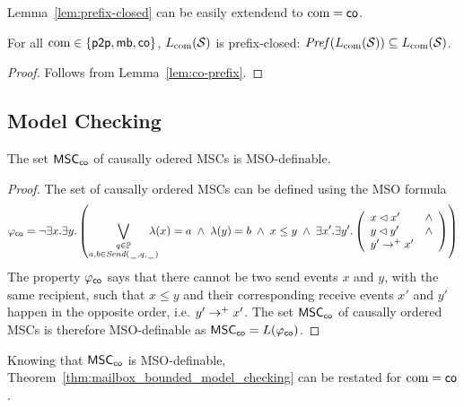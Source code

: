 \documentclass{article}
\begin{document}
Lemma~\ref{lem:prefix-closed} can be easily extendend to $\textup{com} = \mathsf{co}$.

\begin{lemma}\label{lem:co-prefix-closed}
	For all $\textup{com} \in \{\mathsf{p2p}, \mathsf{mb}, \mathsf{co}\}$, $L_{\textup{com}}(\mathcal{S})$ is prefix-closed:
	$\mathit{Pref}(L_{\textup{com}}(\mathcal{S})) \subseteq L_{\textup{com}}(\mathcal{S})$.
\end{lemma}
\begin{proof}
	Follows from Lemma~\ref{lem:co-prefix}.
\end{proof}

\subsection{Model Checking}

\begin{proposition}\label{prop:co_mso}
	The set $\mathsf{MSC}_{\mathsf{co}}$ of causally odered MSCs is MSO-definable.
\end{proposition}
\begin{proof}
	The set of causally ordered MSCs can be defined using the MSO formula
	\[
	\varphi_{\mathsf{co}} =
	\neg \exists x.\exists y. \left(
	\bigvee_{\substack{q \in \mathbb{P}\\a,b \in {\mathit{Send}(\hspace{0.1em}\underline{\hspace{0.5em}}\hspace{0.1em},q,\hspace{0.1em}\underline{\hspace{0.5em}}\hspace{0.1em})}}}\hspace{-1em}
	\lambda(x) = a \;\wedge\; \lambda(y) = b
	\;\wedge\; x \le y \;\wedge\;
	\exists x'.\exists y'. \left(
	\begin{array}{ll}
		x \lhd x' & \wedge\\
		y \lhd y' & \wedge\\
		y' \to^+ x' &
	\end{array} \right)
	\right)
	\]
	The property $\varphi_{\mathsf{co}}$ says that there cannot be two send events $x$ and $y$, with the same recipient, such that $x \le y$ and their corresponding receive events $x'$ and $y'$ happen in the opposite order, i.e. $y' \to^+ x'$. The set $\mathsf{MSC}_{\mathsf{co}}$ of causally ordered MSCs is therefore MSO-definable as $\mathsf{MSC}_{\mathsf{co}}=L(\varphi_{\mathsf{co}})$.
\end{proof}

Knowing that $\mathsf{MSC}_{\mathsf{co}}$ is MSO-definable, Theorem~\ref{thm:mailbox_bounded_model_checking} can be restated for $\textup{com} = \mathsf{co}$.
\end{document}
